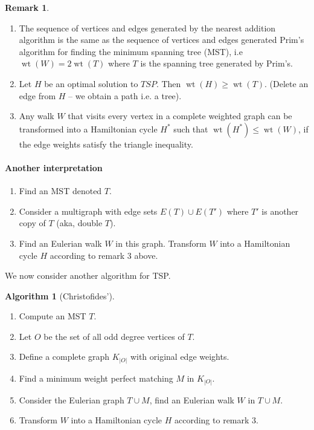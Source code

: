 \documentclass{article}
\theoremstyle{definition}
\newtheorem*{rem}{Remark}
\newtheorem*{alg}{Algorithm}
\DeclareMathOperator{\wt}{wt}
\begin{document}
\begin{rem}
\begin{enumerate}
\item The sequence of vertices and edges generated by the nearest addition algorithm is the same as the sequence of vertices and edges generated Prim's algorithm for finding the minimum spanning tree (MST), i.e $\wt(W) = 2\wt(T)$ where $T$ is the spanning tree generated by Prim's.
\item Let $H$ be an optimal solution to $TSP$. Then $\wt(H) \ge \wt(T)$.
(Delete an edge from $H$ -- we obtain a path i.e. a tree).
\item Any walk $W$ that visits every vertex in a complete weighted graph can be transformed into a Hamiltonian cycle $H^*$ such that $\wt(H^*) \le \wt(W)$, if the edge weights satisfy the triangle inequality.
\end{enumerate}
\end{rem}


\paragraph{Another interpretation}
\begin{enumerate}
\item Find an MST denoted $T$.
\item Consider a multigraph with edge sets $E(T)\cup E(T')$ where $T'$ is another copy of $T$ (aka, double $T$).
\item Find an Eulerian walk $W$ in this graph.
Transform $W$ into a Hamiltonian cycle $H$ according to remark 3 above.
\end{enumerate}

We now consider another algorithm for TSP.

\begin{alg}[Christofides']~\\
\begin{enumerate}
\item Compute an MST $T$.
\item Let $O$ be the set of all odd degree vertices of $T$.
\item Define a complete graph $K_{|O|}$ with original edge weights.
\item Find a minimum weight perfect matching $M$ in $K_{|O|}$.
\item Consider the Eulerian graph $T\cup M$, find an Eulerian walk $W$ in $T\cup M$.
\item Transform $W$ into a Hamiltonian cycle $H$ according to remark 3.
\end{enumerate}
\end{alg}
\end{document}
